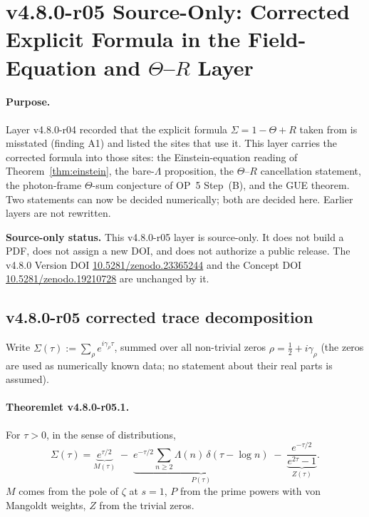 
\clearpage
\section*{v4.8.0-r05 Source-Only: Corrected Explicit Formula in the Field-Equation and \texorpdfstring{$\Theta$}{Theta}--\texorpdfstring{$R$}{R} Layer}
\label{sec:v480-r05-corrected-explicit-formula}

\paragraph{Purpose.}
Layer v4.8.0-r04 recorded that the explicit formula \(\Sigma=1-\Theta+R\) taken from
\cite{brendecke2026rh} is misstated (finding A1) and listed the sites that use it.  This layer
carries the corrected formula into those sites: the Einstein-equation reading of
Theorem~\ref{thm:einstein}, the bare-\(\Lambda\) proposition, the \(\Theta\)--\(R\) cancellation
statement, the photon-frame \(\Theta\)-sum conjecture of OP~5 Step~(B), and the GUE theorem.
Two statements can now be decided numerically; both are decided here.  Earlier layers are not
rewritten.

\noindent\textbf{Source-only status.}
This v4.8.0-r05 layer is source-only.  It does not build a PDF, does not assign a new DOI,
and does not authorize a public release.  The v4.8.0 Version DOI
\href{https://doi.org/10.5281/zenodo.23365244}{10.5281/zenodo.23365244} and the Concept DOI
\href{https://doi.org/10.5281/zenodo.19210728}{10.5281/zenodo.19210728} are unchanged by it.

\subsection*{v4.8.0-r05 corrected trace decomposition}
\label{subsec:v480-r05-trace-decomposition}

Write \(\Sigma(\tau):=\sum_\rho e^{i\gamma_\rho\tau}\), summed over all non-trivial zeros
\(\rho=\tfrac12+i\gamma_\rho\) (the zeros are used as numerically known data; no statement about
their real parts is assumed).

\paragraph{Theoremlet v4.8.0-r05.1.}
For \(\tau>0\), in the sense of distributions,
\[
\Sigma(\tau)
=\underbrace{e^{\tau/2}}_{M(\tau)}
\;-\;\underbrace{e^{-\tau/2}\sum_{n\ge2}\Lambda(n)\,\delta(\tau-\log n)}_{P(\tau)}
\;-\;\underbrace{\frac{e^{-\tau/2}}{e^{2\tau}-1}}_{Z(\tau)} .
\]
\(M\) comes from the pole of \(\zeta\) at \(s=1\), \(P\) from the prime powers with von Mangoldt
weights, \(Z\) from the trivial zeros.

